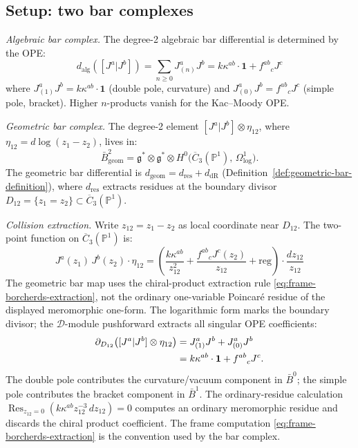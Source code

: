 \subsection{Setup: two bar complexes}

\begin{computation}
\label{comp:geom-alg-comparison-deg2}

\emph{Algebraic bar complex.}
The degree-2 algebraic bar differential is determined by the OPE:
\begin{equation}\label{eq:alg-bar-def}
d_{\mathrm{alg}}([J^a|J^b])
= \sum_{n \geq 0} J^a_{(n)} J^b
= k\kappa^{ab}\cdot\mathbf{1} + {f^{ab}}_c J^c
\end{equation}
where $J^a_{(1)} J^b = k\kappa^{ab}\cdot\mathbf{1}$ (double pole,
curvature) and $J^a_{(0)} J^b = {f^{ab}}_c J^c$ (simple pole,
bracket). Higher $n$-products vanish for the Kac--Moody OPE.

\emph{Geometric bar complex.}
The degree-2 element $[J^a|J^b] \otimes \eta_{12}$, where
$\eta_{12} = d\log(z_1 - z_2)$, lives in:
\[
\bar{B}^2_{\mathrm{geom}} = \mathfrak{g}^* \otimes \mathfrak{g}^*
\otimes H^0\bigl(\overline{C}_3(\mathbb{P}^1),\,
\Omega^1_{\log}\bigr).
\]
The geometric bar differential is
$d_{\mathrm{geom}} = d_{\mathrm{res}} + d_{\mathrm{dR}}$
(Definition~\ref{def:geometric-bar-definition}), where $d_{\mathrm{res}}$
extracts residues at the boundary divisor $D_{12} = \{z_1 = z_2\}
\subset \overline{C}_3(\mathbb{P}^1)$.

\emph{Collision extraction.}
Write $z_{12} = z_1 - z_2$ as local coordinate near $D_{12}$.
The two-point function on $\overline{C}_3(\mathbb{P}^1)$ is:
\begin{equation}
J^a(z_1)\, J^b(z_2) \cdot \eta_{12}
= \left(\frac{k\kappa^{ab}}{z_{12}^2}
+ \frac{{f^{ab}}_c J^c(z_2)}{z_{12}} + \text{reg}\right)
\cdot \frac{dz_{12}}{z_{12}}
\end{equation}
The geometric bar map uses the chiral-product extraction rule
\eqref{eq:frame-borcherds-extraction}, not the ordinary one-variable
Poincar\'e residue of the displayed meromorphic one-form. The
logarithmic form marks the boundary divisor; the
$\mathcal D$-module pushforward extracts all singular OPE coefficients:
\begin{align}
\partial_{D_{12}}\bigl([J^a|J^b]\otimes\eta_{12}\bigr)
&=
J^a_{(1)}J^b + J^a_{(0)}J^b \notag \\
&=
k\kappa^{ab}\cdot\mathbf{1}+{f^{ab}}_cJ^c.
\label{eq:geom-residue-simple}
\end{align}
The double pole contributes the curvature/vacuum component in
$\bar B^0$; the simple pole contributes the bracket component in
$\bar B^1$. The ordinary-residue calculation
$\operatorname{Res}_{z_{12}=0}(k\kappa^{ab}z_{12}^{-3}\,dz_{12})=0$
computes an ordinary meromorphic residue and discards the chiral
product coefficient. The frame computation
\eqref{eq:frame-borcherds-extraction} is the convention used by the
bar complex.


\end{computation}
